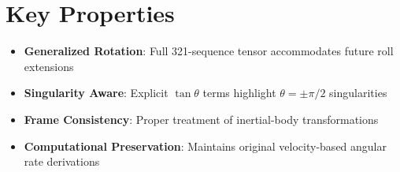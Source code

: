\documentclass{article}
\begin{document}
	\section{Key Properties}
	\begin{itemize}
		\item \textbf{Generalized Rotation}: Full 321-sequence tensor accommodates future roll extensions
		\item \textbf{Singularity Aware}: Explicit \(\tan\theta\) terms highlight \(\theta = \pm\pi/2\) singularities
		\item \textbf{Frame Consistency}: Proper treatment of inertial-body transformations
		\item \textbf{Computational Preservation}: Maintains original velocity-based angular rate derivations
	\end{itemize}
\end{document}
